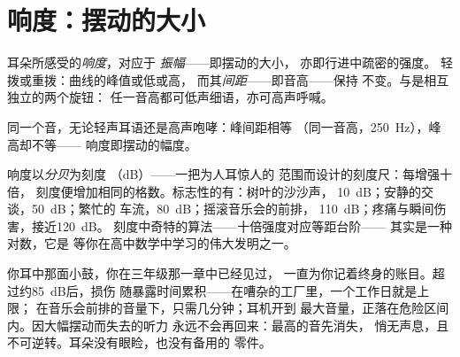 \section{响度：摆动的大小}

\begin{proposition}[响度即振幅]\label{prop:g8:sound-pitch-loudness:loudness}
耳朵所感受的\emph{响度}，对应于
\emph{振幅}——即摆动的大小，
亦即行进中疏密的强度。
轻拨或重拨：曲线的峰值或低或高，
而其\emph{间距}——即音高——保持
不变。与是相互独立的两个旋钮：
任一音高都可低声细语，亦可高声呼喊。
\end{proposition}

\begin{omfigure}

{\small 同一个音，无论轻声耳语还是高声咆哮：峰间距相等
（同一音高，\qty{250}{Hz}），峰高却不等——
响度即摆动的幅度。}
\end{omfigure}

\begin{example}[分贝刻度]\label{ex:g8:sound-pitch-loudness:decibels}
响度以\emph{分贝}为刻度
（\unit{dB}）——一把为人耳惊人的
范围而设计的刻度尺：每增强十倍，
刻度便增加相同的格数。标志性的有：树叶的沙沙声，
\qty{10}{dB}；安静的交谈，\qty{50}{dB}；繁忙的
车流，\qty{80}{dB}；摇滚音乐会的前排，
\qty{110}{dB}；疼痛与瞬间伤害，接近\qty{120}{dB}。
刻度中奇特的算法——十倍强度对应等距台阶——
其实是一种对数，它是
等你在高中数学中学习的伟大发明之一。
\end{example}

\begin{remark}[耳朵的听力账本]\label{rem:g8:sound-pitch-loudness:earsafety}
你耳中那面小鼓，你在三年级那一章中已经见过，
一直为你记着终身的账目。超过约\qty{85}{dB}后，损伤
随暴露时间累积——在嘈杂的工厂里，一个工作日就是上限；
在音乐会前排的音量下，只需几分钟；耳机开到
最大音量，正落在危险区间内。因大幅摆动而失去的听力
永远不会再回来：最高的音先消失，
悄无声息，且不可逆转。耳朵没有眼睑，也没有备用的
零件。
\end{remark}

